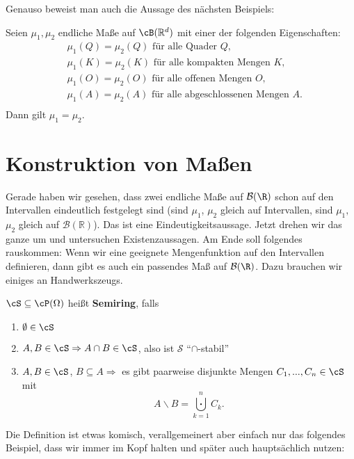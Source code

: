 Genauso beweist man auch die Aussage des n\"achsten Beispiels:
\begin{beispiel}
	Seien $\mu_1, \mu_2$ endliche Maße auf $\cB(\mathbb{R}^d)$ mit einer der folgenden Eigenschaften:
	\begin{align*}
	&\mu_1(Q) = \mu_2(Q) \text{ für alle Quader } Q,\\
	&\mu_1(K) = \mu_2(K) \text{ für alle kompakten Mengen } K,\\
	&\mu_1(O) = \mu_2(O) \text{ für alle offenen Mengen } O,\\
	&\mu_1(A) = \mu_2(A) \text{ für alle abgeschlossenen Mengen } A.\\
	\end{align*}
	Dann gilt $\mu_1 = \mu_2$.
\end{beispiel}

\section{Konstruktion von Maßen}
Gerade haben wir gesehen, dass zwei endliche Ma\ss e auf $\mathcal B(\R)$ schon auf den Intervallen eindeutlich festgelegt sind (sind $\mu_1$, $\mu_2$ gleich auf Intervallen, sind $\mu_1,$ $\mu_2$ gleich auf $\mathcal B(\mathbb R)$). Das ist eine Eindeutigkeitsaussage. Jetzt drehen wir das ganze um und untersuchen Existenzaussagen. Am Ende soll folgendes rauskommen: Wenn wir eine \glqq geeignete Mengenfunktion\grqq{} auf den Intervallen definieren, dann gibt es auch ein passendes Ma\ss{} auf $\mathcal B(\R)$. Dazu brauchen wir einiges an Handwerkszeugs.
\begin{deff}
	$\cS \subseteq \cP(\Omega)$ heißt \textbf{Semiring}, falls
	\begin{enumerate}[label=(\roman*)]
		\item $\emptyset \in \cS$
		\item $A,B \in \cS \Rightarrow A\cap B \in \cS$, also ist $\mathcal S$ \enquote{$\cap$-stabil}
		\item \label{semiring drittens} $A,B \in \cS$, $B \subseteq A \Rightarrow$ es gibt paarweise disjunkte Mengen $C_1,...,C_n \in \cS$ mit \[ A \backslash B = \bigcupdot\limits_{k=1}^{n} C_k. \]
	\end{enumerate}
\end{deff}
Die Definition ist etwas komisch, verallgemeinert aber einfach nur das folgendes Beispiel, dass wir immer im Kopf halten und sp\"ater auch haupts\"achlich nutzen:
